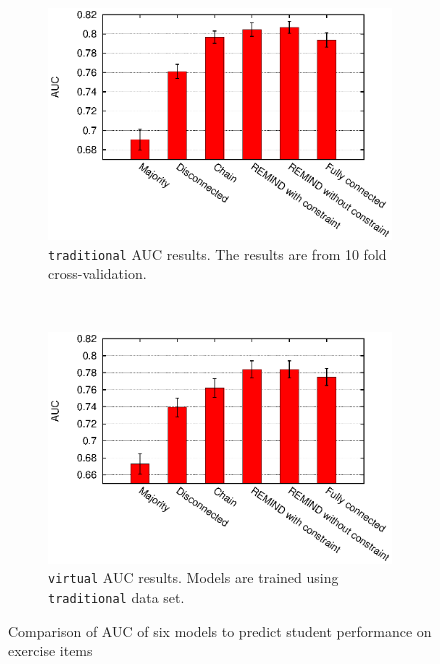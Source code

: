 \documentclass{edm_template}
\begin{document}
{	\begin{figure}[ht]
		\centering
		\begin{subfigure}[b]{1.0\linewidth}
			\centering
			\includegraphics[width=0.9\linewidth]{figures/chap123_auc_allmodels.eps}
			\caption{\texttt{traditional} AUC results. The results are from 10 fold cross-validation.}
			\label{fig:auc-cv}
		\end{subfigure}\\
		\begin{subfigure}[b]{1.0\linewidth}
			\centering
			\includegraphics[width=0.9\linewidth]{figures/chap123conn_auc_allmodels.eps}
			\caption{\texttt{virtual} AUC results. Models are trained using  \texttt{traditional} data set.}
			\label{fig:conn-auc}
		\end{subfigure}%
		\caption{Comparison of AUC of six models to predict student performance on exercise items}
	\end{figure} 
	
	
	
	
	
}
\end{document}
